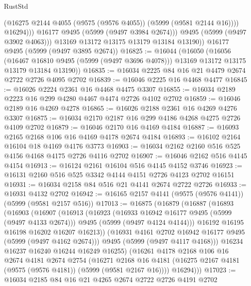 \begin{lexlean}{RustStd}
\begin{coremodule}
                    (@16275 @2144 @4055 (@9575 (@9576 @4055)) (@5999 (@9581 @2144 @16))))
                  @16294)))
            @16177
            @9495
            (@5999 (@9497 @3984 @2674)))
          @9495
          (@5999 (@9497 @3902 @4063)))
        @13169
        @13172
        @13175
        @13179
        @13184
        @13190))
    @16177
    @9495
    (@5999 (@9497 @3895 @2674))
@16825 := @16044
    (@16050
      (@16056
        (@16467 @16810 @9495 (@5999 (@9497 @3696 @4078)))
        @13169
        @13172
        @13175
        @13179
        @13184
        @13190))
@16835 := @16034 @2225 @84 @16 @21 @4479 @2674 @2722 @2726 @4095 @2702
@16839 := @16046 @2225 @16 @4468 @4477
@16845 := @16026 @2224 @2361 @16 @4468 @4475 @3307
@16855 := @16034 @2189 @2223 @16 @299 @4280 @4467 @4474 @2726 @4102 @2702
@16859 := @16046 @2189 @16 @4269 @4278
@16865 := @16026 @2188 @2361 @16 @4269 @4276 @3307
@16875 := @16034 @2170 @2187 @16 @299 @4186 @4268 @4275 @2726 @4109 @2702
@16879 := @16046 @2170 @16 @4169 @4184
@16887 := @16093 @2165 @2168 @106 @16 @4169 @4178 @2674 @4184
@16893 := @16102 @2164 @16104 @18 @4169 @4176 @3773
@16903 := @16034 @2162 @2160 @516 @525 @4156 @4168 @4175 @2726 @4116 @2702
@16907 := @16046 @2162 @516 @4145 @4154
@16913 := @16124 @2161 @16104 @516 @4145 @4152 @3746
@16923 := @16131 @2160 @516 @525 @3342 @4144 @4151 @2726 @4123 @2702 @16151
@16931 := @16034 @2158 @84 @516 @21 @4141 @2674 @2722 @2726
@16933 := @16931 @4132 @2702
@16942 := @16165 @2157 @4141 (@9575 (@9576 @4141)) (@5999 (@9581 @2157 @516))
@17013 := @16875
    (@16879
      (@16887
        (@16893
          (@16903
            (@16907
              (@16913
                (@16923
                  (@16933 @16942 @16177 @9495 (@5999 (@9497 @4133 @2674)))
                  @9495
                  (@5999 (@9497 @4124 @4144)))
                @16192
                @16195
                @16198
                @16202
                @16207
                @16213))
            (@16931 @4161 @2702 @16942 @16177 @9495 (@5999 (@9497 @4162 @2674)))
            @9495
            (@5999 (@9497 @4117 @4168)))
          @16234
          @16237
          @16240
          @16244
          @16249
          @16255)
        (@16261
          @4178
          @2168
          @106
          @16
          @2674
          @4181
          @2674
          @2754
          (@16271
            @2168
            @16
            @4181
            (@16275 @2167 @4181 (@9575 (@9576 @4181)) (@5999 (@9581 @2167 @16))))
          @16294)))
@17023 := @16034 @2185 @84 @16 @21 @4265 @2674 @2722 @2726 @4191 @2702

\end{coremodule}
\end{lexlean}
